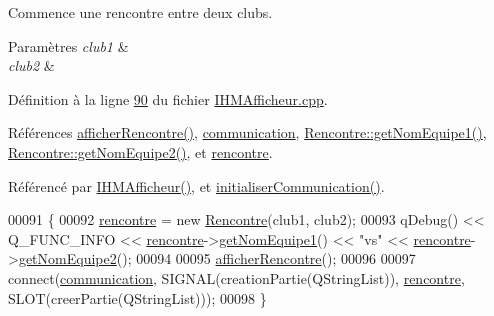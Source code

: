 Commence une rencontre entre deux clubs. 


\begin{DoxyParams}{Paramètres}
{\em club1} & \\
\hline
{\em club2} & \\
\hline
\end{DoxyParams}


Définition à la ligne \hyperlink{_i_h_m_afficheur_8cpp_source_l00090}{90} du fichier \hyperlink{_i_h_m_afficheur_8cpp_source}{I\+H\+M\+Afficheur.\+cpp}.



Références \hyperlink{_i_h_m_afficheur_8cpp_source_l00100}{afficher\+Rencontre()}, \hyperlink{_i_h_m_afficheur_8h_source_l00041}{communication}, \hyperlink{_rencontre_8cpp_source_l00041}{Rencontre\+::get\+Nom\+Equipe1()}, \hyperlink{_rencontre_8cpp_source_l00049}{Rencontre\+::get\+Nom\+Equipe2()}, et \hyperlink{_i_h_m_afficheur_8h_source_l00040}{rencontre}.



Référencé par \hyperlink{_i_h_m_afficheur_8cpp_source_l00022}{I\+H\+M\+Afficheur()}, et \hyperlink{_i_h_m_afficheur_8cpp_source_l00074}{initialiser\+Communication()}.


\begin{DoxyCode}
00091 \{
00092     \hyperlink{class_i_h_m_afficheur_aef34d340f7ea30f049a98efc47bd9779}{rencontre} = \textcolor{keyword}{new} \hyperlink{class_rencontre}{Rencontre}(club1, club2);
00093     qDebug() << Q\_FUNC\_INFO << \hyperlink{class_i_h_m_afficheur_aef34d340f7ea30f049a98efc47bd9779}{rencontre}->\hyperlink{class_rencontre_a50df24caf57437d8eaaadae43ff846ec}{getNomEquipe1}() << \textcolor{stringliteral}{"vs"} << 
      \hyperlink{class_i_h_m_afficheur_aef34d340f7ea30f049a98efc47bd9779}{rencontre}->\hyperlink{class_rencontre_ac544f97755480e0e2718d0802d308585}{getNomEquipe2}();
00094 
00095     \hyperlink{class_i_h_m_afficheur_aec1fee14a130ea53206bf5f8e532b819}{afficherRencontre}();
00096 
00097     connect(\hyperlink{class_i_h_m_afficheur_a331b5544e96cc908336a1486b52c379b}{communication}, SIGNAL(creationPartie(QStringList)), 
      \hyperlink{class_i_h_m_afficheur_aef34d340f7ea30f049a98efc47bd9779}{rencontre}, SLOT(creerPartie(QStringList)));
00098 \}
\end{DoxyCode}
\mbox{\label{class_i_h_m_afficheur_ab7a8db8e7cfa6dc86ab59a07ede75298}} 
